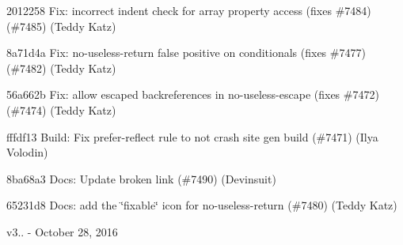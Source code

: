 \begin{DoxyItemize}
\item 2012258 Fix\+: incorrect {\ttfamily indent} check for array property access (fixes \#7484) (\#7485) (Teddy Katz)
\item 8a71d4a Fix\+: {\ttfamily no-\/useless-\/return} false positive on conditionals (fixes \#7477) (\#7482) (Teddy Katz)
\item 56a662b Fix\+: allow escaped backreferences in {\ttfamily no-\/useless-\/escape} (fixes \#7472) (\#7474) (Teddy Katz)
\item fffdf13 Build\+: Fix prefer-\/reflect rule to not crash site gen build (\#7471) (Ilya Volodin)
\item 8ba68a3 Docs\+: Update broken link (\#7490) (Devinsuit)
\item 65231d8 Docs\+: add the \char`\"{}fixable\char`\"{} icon for {\ttfamily no-\/useless-\/return} (\#7480) (Teddy Katz)
\end{DoxyItemize}

v3.. -\/ October 28, 2016


